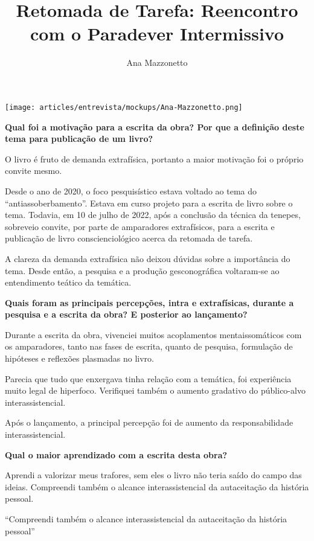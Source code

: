 \documentclass{gescons}
\author{Ana Mazzonetto}
\title{Retomada de Tarefa: Reencontro com o Paradever Intermissivo}
\begin{document}
    \makeentrevistatitle


    \begin{multicols}{2}


\begin{center}

    \texttt{[image: articles/entrevista/mockups/Ana-Mazzonetto.png]}
\end{center}

\textbf{Qual foi a motivação para a escrita da obra? Por que a definição deste tema para publicação de um livro?}

O livro é fruto de demanda extrafísica, portanto a maior motivação foi o próprio convite mesmo. 

Desde o ano de 2020, o foco pesquisístico estava voltado ao tema do “antiassoberbamento”. Estava em curso projeto para a escrita de livro sobre o tema. Todavia, em 10 de julho de 2022, após a conclusão da técnica da tenepes, sobreveio convite, por parte de amparadores extrafísicos, para a escrita e publicação de livro conscienciológico acerca da retomada de tarefa. 

A clareza da demanda extrafísica não deixou dúvidas sobre a importância do tema. Desde então, a pesquisa e a produção gesconográfica voltaram-se ao entendimento teático da temática.

\textbf{Quais foram as principais percepções, intra e extrafísicas, durante a pesquisa e a escrita da obra? E posterior ao lançamento?}

Durante a escrita da obra, vivenciei muitos acoplamentos mentaissomáticos com os amparadores, tanto nas fases de escrita, quanto de pesquisa, formulação de hipóteses e reflexões plasmadas no livro. 

Parecia que tudo que enxergava tinha relação com a temática, foi experiência muito legal de hiperfoco. Verifiquei também o aumento gradativo do público-alvo interassistencial.

Após o lançamento, a principal percepção foi de aumento da responsabilidade interassistencial. 

\textbf{Qual o maior aprendizado com a escrita desta obra?}

Aprendi a valorizar meus trafores, sem eles o livro não teria saído do campo das ideias. Compreendi também o alcance interassistencial da autaceitação da história pessoal.

\begin{pullquote}
``Compreendi também o alcance interassistencial da autaceitação da história pessoal''
\end{pullquote}



\end{multicols}
\end{document}
